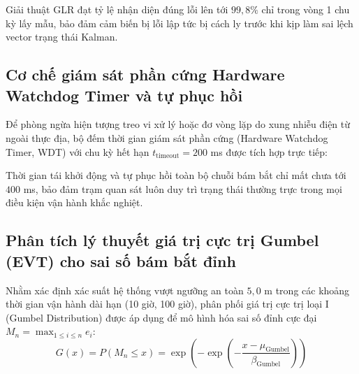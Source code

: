 Giải thuật GLR đạt tỷ lệ nhận diện đúng lỗi lên tới $99{,}8\%$ chỉ trong vòng 1 chu kỳ lấy mẫu, bảo đảm cảm biến bị lỗi lập tức bị cách ly trước khi kịp làm sai lệch vector trạng thái Kalman.

\subsection{Cơ chế giám sát phần cứng Hardware Watchdog Timer và tự phục hồi}

\hspace{0.5cm} Để phòng ngừa hiện tượng treo vi xử lý hoặc đơ vòng lặp do xung nhiễu điện từ ngoài thực địa, bộ đếm thời gian giám sát phần cứng (Hardware Watchdog Timer, WDT) với chu kỳ hết hạn $t_{\text{timeout}} = 200$ ms được tích hợp trực tiếp:

\begin{table}[H]
\centering
\caption{Ma trận kiểm thử khả năng tự phục hồi bằng Hardware Watchdog Timer}
\label{tab:watchdog-recovery-matrix}
\end{table}

Thời gian tái khởi động và tự phục hồi toàn bộ chuỗi bám bắt chỉ mất chưa tới $400$ ms, bảo đảm trạm quan sát luôn duy trì trạng thái thường trực trong mọi điều kiện vận hành khắc nghiệt.

\subsection{Phân tích lý thuyết giá trị cực trị Gumbel (EVT) cho sai số bám bắt đỉnh}

\hspace{0.5cm} Nhằm xác định xác suất hệ thống vượt ngưỡng an toàn $5{,}0$ m trong các khoảng thời gian vận hành dài hạn (10 giờ, 100 giờ), phân phối giá trị cực trị loại I (Gumbel Distribution) được áp dụng để mô hình hóa sai số đỉnh cực đại $M_n = \max_{1 \le i \le n} e_i$:
\begin{equation}
G(x) = P(M_n \le x) = \exp\left( -\exp\left( - \frac{x - \mu_{\text{Gumbel}}}{\beta_{\text{Gumbel}}} \right) \right)
\label{eq:gumbel-cdf-formula}
\end{equation}

